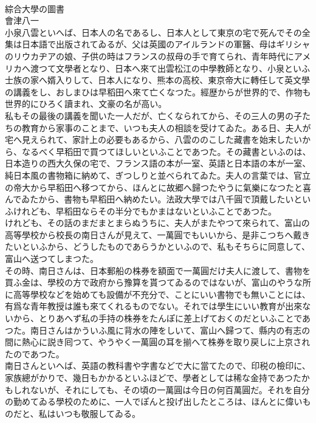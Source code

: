 \documentclass[8pt]{extreport}
\begin{document}
\begin{CJK}{UTF8}{min}
\\	綜合大學の圖書
\\	會津八一
\\	小泉八雲といへば、日本人の名であるし、日本人として東京の宅で死んでその全集は日本語で出版されてゐるが、父は英國のアイルランドの軍醫、母はギリシャのリウカヂアの娘、子供の時はフランスの叔母の手で育てられ、青年時代にアメリカへ渡つて文學者となり、日本へ來て出雲松江の中學教師となり、小泉といふ士族の家へ婿入りして、日本人になり、熊本の高校、東京帝大に轉任して英文學の講義をし、おしまひは早稻田へ來て亡くなつた。經歴からが世界的で、作物も世界的にひろく讀まれ、文豪の名が高い。
\\	私もその最後の講義を聞いた一人だが、亡くなられてから、その三人の男の子たちの教育から家事のことまで、いつも夫人の相談を受けてゐた。ある日、夫人が宅へ見えられて、家計上の必要もあるから、八雲ののこした藏書を始末したいから、なるべく早稻田で買つてほしいといふことであつた。その藏書といふのは、日本造りの西大久保の宅で、フランス語の本が一室、英語と日本語の本が一室、純日本風の書物箱に納めて、ぎつしりと並べられてゐた。夫人の言葉では、官立の帝大から早稻田へ移つてから、ほんとに故郷へ歸つたやうに氣樂になつたと喜んでゐたから、書物も早稻田へ納めたい。法政大學では八千圓で頂戴したいといふけれども、早稻田ならその半分でもかまはないといふことであつた。
\\	けれども、その話のまだまとまらぬうちに、夫人がまたやつて來られて、富山の高等學校から校長の南日さんが見えて、一萬圓でもいいから、是非こつちへ戴きたいといふから、どうしたものであらうかといふので、私もそちらに同意して、富山へ送つてしまつた。
\\	その時、南日さんは、日本郵船の株券を額面で一萬圓だけ夫人に渡して、書物を買ふ金は、學校の方で政府から豫算を貰つてゐるのではないが、富山のやうな所に高等學校などを始めても設備が不充分で、ことにいい書物でも無いことには、有爲な青年教授は誰も來てくれるものでない。それでは學生にいい教育が出來ないから、とりあへず私の手持の株券をたんぽに差上げておくのだといふことであつた。南日さんはかういふ風に背水の陣をしいて、富山へ歸つて、縣内の有志の間に熱心に説き囘つて、やうやく一萬圓の耳を揃へて株券を取り戻しに上京されたのであつた。
\\	南日さんといへば、英語の教科書や字書などで大に當てたので、印税の檢印に、家族總がかりで、幾日もかかるといふほどで、學者としては稀な金持であつたかもしれないが、それにしても、その頃の一萬圓は今日の何百萬圓だ。それを自分の勤めてゐる學校のために、一人でぽんと投げ出したところは、ほんとに偉いものだと、私はいつも敬服してゐる。

\end{CJK}
\end{document}
